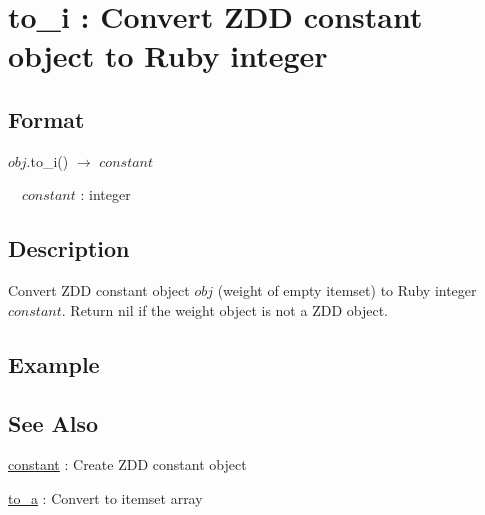 
\section{to\_i : Convert ZDD constant object to Ruby integer\label{sect:to_i}}
\subsection*{Format}
$obj$.to\_i() $\rightarrow$ $constant$

~~$constant$ : integer

\subsection*{Description}
Convert ZDD constant object $obj$ (weight of empty itemset) to Ruby integer $constant$. Return nil if the weight object is not a ZDD object. 


\subsection*{Example}


\subsection*{See Also}
\hyperref[sect:constant]{constant} : Create ZDD constant object 

\hyperref[sect:to_a]{to\_a} : Convert to itemset array

